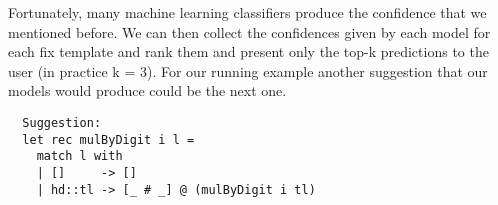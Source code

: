  Fortunately, many machine learning classifiers produce the confidence that we mentioned before. We can then collect the confidences given by each model for each fix template and rank them and present only the top-k predictions to the user (in practice k = 3). For our running example another suggestion that our models would produce could be the next one.

\begin{verbatim}
  Suggestion:
  let rec mulByDigit i l =
    match l with
    | []     -> []
    | hd::tl -> [_ # _] @ (mulByDigit i tl)
\end{verbatim}
